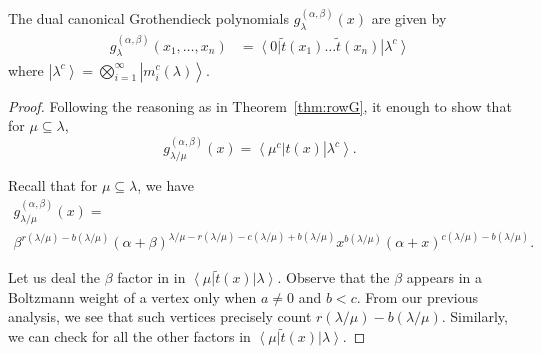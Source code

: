 \documentclass[ALCO, Unicode]{cedram}
\newcommand{\bra}[1]{\left\langle #1\right|}
\newcommand{\ket}[1]{\left|#1\right\rangle}
\newcommand\g{{g^{(\alpha,\beta)}_{\lambda}}}
\begin{document}
\begin{thm}
\label{thm:colg}
The dual canonical Grothendieck polynomials $\g(x)$  are given by
%
\begin{align}
\label{colg}
\g(x_1,\dots,x_n)
&=
\bra{0}
\tilde{t}(x_1)
\dots
\tilde{t}(x_n)
\ket{\lambda^c}
\end{align}
where $\ket{\lambda^c} = \bigotimes_{i=1}^{\infty} \ket{m^c_i(\lambda)}$.
\end{thm}

\begin{proof}
Following the reasoning as in Theorem~\ref{thm:rowG}, it enough to show that for $\mu\subseteq\lambda$,
\[
g^{(\alpha,\beta)}_{\lambda/\mu}(x)=\bra{\mu^c}t(x)\ket{\lambda^c}.
\]

Recall that for $\mu\subseteq\lambda$, we have
\begin{multline*}
g_{\lambda/\mu}^{(\alpha,\beta)}(x)=\\
\beta^{r(\lambda/\mu)-b(\lambda/\mu)}(\alpha+\beta)^{\lambda/\mu - r(\lambda/\mu)-c(\lambda/\mu)+b(\lambda/\mu)} x^{b(\lambda/\mu)}{(\alpha+x)}^{c(\lambda/\mu)-b(\lambda/\mu)}.
\end{multline*}




Let us deal the $\beta$ factor in in $\bra{\mu}\tilde{t}(x)\ket{\lambda}$. Observe that the $\beta$ appears in a Boltzmann weight of a vertex only when $a\neq0$ and $b<c$. From our previous analysis, we see that such vertices precisely count $r(\lambda/\mu)-b(\lambda/\mu)$. Similarly, we can check for all the other factors in $\bra{\mu}\tilde{t}(x)\ket{\lambda}$.
\end{proof}
\end{document}
